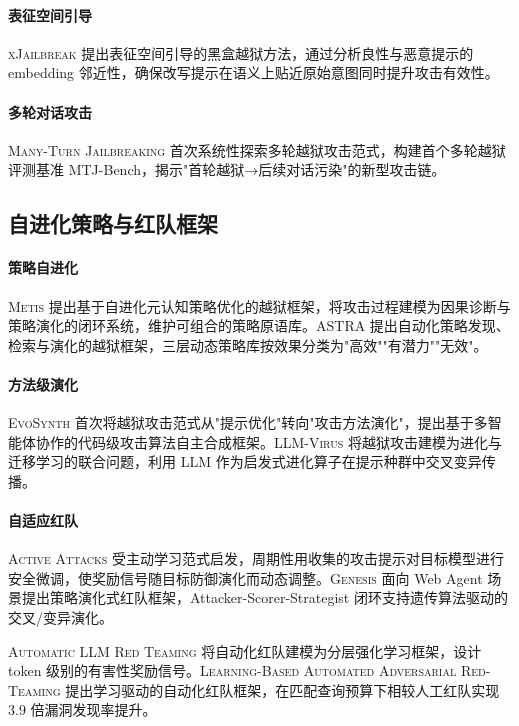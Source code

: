 \documentclass[12pt,a4paper]{article}
\begin{document}
\paragraph{表征空间引导}
\textsc{xJailbreak}\cite{lee2025xjailbreak} 提出表征空间引导的黑盒越狱方法，通过分析良性与恶意提示的 embedding 邻近性，确保改写提示在语义上贴近原始意图同时提升攻击有效性。

\paragraph{多轮对话攻击}
\textsc{Many-Turn Jailbreaking}\cite{yang2025manyturn} 首次系统性探索多轮越狱攻击范式，构建首个多轮越狱评测基准 MTJ-Bench，揭示"首轮越狱→后续对话污染"的新型攻击链。

\subsection{自进化策略与红队框架}

\paragraph{策略自进化}
\textsc{Metis}\cite{chen2026metis} 提出基于自进化元认知策略优化的越狱框架，将攻击过程建模为因果诊断与策略演化的闭环系统，维护可组合的策略原语库。\textsc{ASTRA}\cite{liu2026astra} 提出自动化策略发现、检索与演化的越狱框架，三层动态策略库按效果分类为"高效""有潜力""无效"。

\paragraph{方法级演化}
\textsc{EvoSynth}\cite{chen2025evosynth} 首次将越狱攻击范式从"提示优化"转向"攻击方法演化"，提出基于多智能体协作的代码级攻击算法自主合成框架。\textsc{LLM-Virus}\cite{zhang2026llmvirus} 将越狱攻击建模为进化与迁移学习的联合问题，利用 LLM 作为启发式进化算子在提示种群中交叉变异传播。

\paragraph{自适应红队}
\textsc{Active Attacks}\cite{yun2025active} 受主动学习范式启发，周期性用收集的攻击提示对目标模型进行安全微调，使奖励信号随目标防御演化而动态调整。\textsc{Genesis}\cite{zhang2025genesis} 面向 Web Agent 场景提出策略演化式红队框架，Attacker-Scorer-Strategist 闭环支持遗传算法驱动的交叉/变异演化。

\textsc{Automatic LLM Red Teaming}\cite{belaire2025automatic} 将自动化红队建模为分层强化学习框架，设计 token 级别的有害性奖励信号。\textsc{Learning-Based Automated Adversarial Red-Teaming}\cite{wei2025learning} 提出学习驱动的自动化红队框架，在匹配查询预算下相较人工红队实现 3.9 倍漏洞发现率提升。
\end{document}
